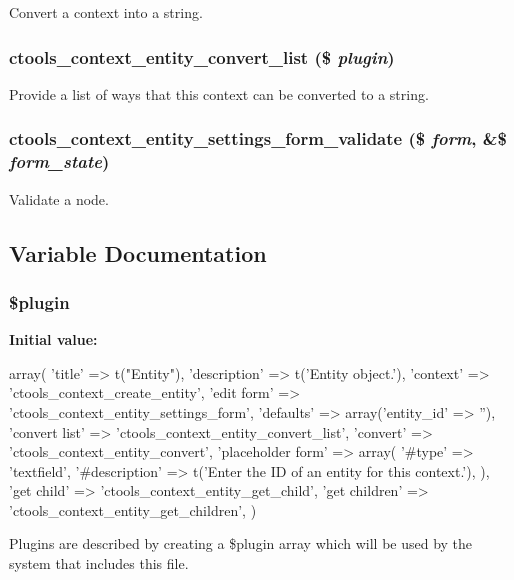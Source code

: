 Convert a context into a string. \hypertarget{entity_8inc_adddf0221dfebd051d7f9ac67d39ab61b}{
\subsubsection[{ctools\_\-context\_\-entity\_\-convert\_\-list}]{\setlength{\rightskip}{0pt plus 5cm}ctools\_\-context\_\-entity\_\-convert\_\-list (\$ {\em plugin})}}
\label{entity_8inc_adddf0221dfebd051d7f9ac67d39ab61b}
Provide a list of ways that this context can be converted to a string. \hypertarget{entity_8inc_a65bdc35857e126643659af44b8b7cf04}{
\subsubsection[{ctools\_\-context\_\-entity\_\-settings\_\-form\_\-validate}]{\setlength{\rightskip}{0pt plus 5cm}ctools\_\-context\_\-entity\_\-settings\_\-form\_\-validate (\$ {\em form}, \/  \&\$ {\em form\_\-state})}}
\label{entity_8inc_a65bdc35857e126643659af44b8b7cf04}
Validate a node. 

\subsection{Variable Documentation}
\hypertarget{entity_8inc_ada8a7130088351710bb02ed622d6bf65}{
\subsubsection[{\$plugin}]{\setlength{\rightskip}{0pt plus 5cm}\$plugin}}
\label{entity_8inc_ada8a7130088351710bb02ed622d6bf65}
{\bfseries Initial value:}
\begin{DoxyCode}
 array(
  'title' => t("Entity"),
  'description' => t('Entity object.'),
  'context' => 'ctools_context_create_entity',
  'edit form' => 'ctools_context_entity_settings_form',
  'defaults' => array('entity_id' => ''),
  'convert list' => 'ctools_context_entity_convert_list',
  'convert' => 'ctools_context_entity_convert',
  'placeholder form' => array(
    '#type' => 'textfield',
    '#description' => t('Enter the ID of an entity for this context.'),
  ),
  'get child' => 'ctools_context_entity_get_child',
  'get children' => 'ctools_context_entity_get_children',
)
\end{DoxyCode}
Plugins are described by creating a \$plugin array which will be used by the system that includes this file. 